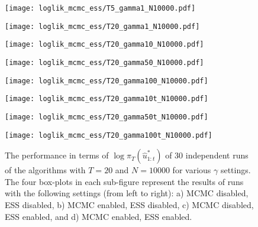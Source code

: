 \begin{figure}[!thbp]
    \centering
    \begin{minipage}{.5\textwidth}
        \centering
        \texttt{[image: loglik\_mcmc\_ess/T5\_gamma1\_N10000.pdf]}
      
    \end{minipage}%
    \begin{minipage}{0.5\textwidth}
        \centering
        \texttt{[image: loglik\_mcmc\_ess/T20\_gamma1\_N10000.pdf]}
      
    \end{minipage}
    \begin{minipage}{0.5\textwidth}
        \centering
        \texttt{[image: loglik\_mcmc\_ess/T20\_gamma10\_N10000.pdf]}
      
    \end{minipage}%
    \begin{minipage}{0.5\textwidth}
        \centering
        \texttt{[image: loglik\_mcmc\_ess/T20\_gamma50\_N10000.pdf]}
      
    \end{minipage}
    \begin{minipage}{0.5\textwidth}
        \centering
        \texttt{[image: loglik\_mcmc\_ess/T20\_gamma100\_N10000.pdf]}
      
    \end{minipage}%
    \begin{minipage}{0.5\textwidth}
        \centering
        \texttt{[image: loglik\_mcmc\_ess/T20\_gamma10t\_N10000.pdf]}
      
    \end{minipage}
    \begin{minipage}{0.5\textwidth}
        \centering
        \texttt{[image: loglik\_mcmc\_ess/T20\_gamma50t\_N10000.pdf]}
      
    \end{minipage}%
    \begin{minipage}{0.5\textwidth}
        \centering
        \texttt{[image: loglik\_mcmc\_ess/T20\_gamma100t\_N10000.pdf]}
    \end{minipage}
    \caption{The performance in terms of $\log\pi_T(\hat{u}^*_{1:t})$ of 30 independent runs of the algorithms  with $T=20$ and $N=10000$ for various $\gamma$ settings. The four box-plots in each sub-figure represent the results of runs with the following settings (from left to right): a) MCMC disabled, ESS disabled, b) MCMC enabled, ESS disabled, c) MCMC disabled, ESS enabled, and d) MCMC enabled, ESS enabled.   }
    \label{fig:ess}
\end{figure}

